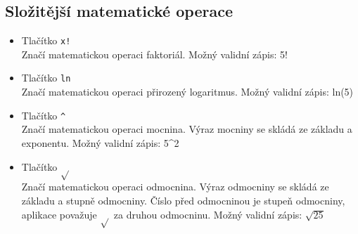 \documentclass[a4paper, 11pt]{article}
\begin{document}
\subsection{Složitější matematické operace}
\begin{itemize}
\item Tlačítko \texttt{x!}\\Značí matematickou operaci faktoriál. Možný validní zápis: 5!
\item Tlačítko \texttt{ln}\\Značí matematickou operaci přirozený logaritmus. Možný validní zápis: ln(5)
\item Tlačítko \texttt{\^}\\Značí matematickou operaci mocnina. Výraz mocniny se skládá ze základu a exponentu. Možný validní zápis: 5\string^2
\item Tlačítko \texttt{$\sqrt{}$}\\Značí matematickou operaci odmocnina. Výraz odmocniny se skládá ze základu a stupně odmocniny. Číslo před odmocninou je stupeň odmocniny, aplikace považuje $\sqrt{}$ za druhou odmocninu. Možný validní zápis: $\sqrt{25}$
\end{itemize}
\end{document}
